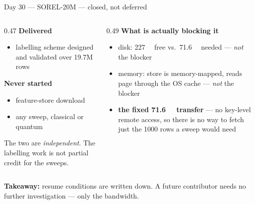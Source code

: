 \documentclass[aspectratio=169,11pt]{beamer}
\newcommand{\take}[1]{%
  \vspace{0.4em}\footnotesize\textbf{\color{blue!55!black}Takeaway:} #1}
\newcommand{\daytag}[1]{{\color{blue!55!black}Day #1} --- }
\begin{document}
\begin{frame}{\daytag{30}SOREL-20M --- closed, not deferred}
\small
\begin{columns}[T,onlytextwidth]
\begin{column}{0.47\textwidth}
\textbf{Delivered}
\begin{itemize}\small
  \item labelling scheme designed and validated over 19.7M rows
\end{itemize}
\vspace{0.4em}
\textbf{Never started}
\begin{itemize}\small
  \item feature-store download
  \item any sweep, classical or quantum
\end{itemize}
\vspace{0.3em}
The two are \emph{independent}. The labelling work is not partial credit for
the sweeps.
\end{column}
\begin{column}{0.49\textwidth}
\textbf{What is actually blocking it}
\begin{itemize}\small
  \item disk: \SI{227}{\gibi\byte} free vs.\ \SI{71.6}{\gibi\byte} needed
        --- \emph{not} the blocker
  \item memory: store is memory-mapped, reads page through the OS cache
        --- \emph{not} the blocker
  \item \textbf{the fixed \SI{71.6}{\gibi\byte} transfer} --- no key-level
        remote access, so there is no way to fetch just the 1000 rows a sweep
        would need
\end{itemize}
\end{column}
\end{columns}

\take{resume conditions are written down. A future contributor needs no further
investigation --- only the bandwidth.}
\end{frame}
\end{document}

